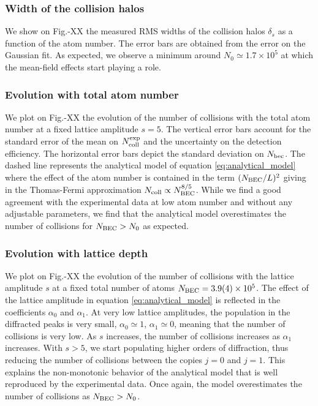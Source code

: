 \subsubsection{Width of the collision halos}

We show on Fig.-XX the measured RMS widths of the collision halos $\delta_s$ as a function of the atom number. The error bars are obtained from the error on the Gaussian fit. As expected, we observe a minimum around $N_0 \simeq 1.7 \times 10^5$ at which the mean-field effects start playing a role. 

\subsubsection{Evolution with total atom number}

We plot on Fig.-XX the evolution of the number of collisions with the total atom number at a fixed lattice amplitude $s=5$. The vertical error bars account for the standard error of the mean on $N_{\rm{coll}}^{\rm{exp}}$ and the uncertainty on the detection  efficiency. The horizontal error  bars depict the standard deviation on $N_{\rm{bec}}$. The dashed line represents the analytical model of equation \ref{eq:analytical_model} where the effect of the atom number is contained in the term $(N_{\rm{BEC}}/L)^2$ giving in the Thomas-Fermi approximation $N_{\rm{coll}} \propto N_{\rm{BEC}}^{8/5}$. While we find a good agreement with the experimental data at low atom number and without any adjustable parameters, we find that the analytical model overestimates the number of collisions for $N_{\rm{BEC}} > N_0$ as expected.

\subsubsection{Evolution with lattice depth}

 We plot on Fig.-XX the evolution of the number of collisions with the lattice amplitude $s$ at a fixed total number of atoms $N_{\rm{BEC}} = 3.9(4) \times 10^5$. The effect of the lattice amplitude in equation \ref{eq:analytical_model} is reflected in the coefficients $\alpha_0$ and $\alpha_1$. At very low lattice amplitudes, the population in the diffracted peaks is very small, $\alpha_0 \simeq 1$, $\alpha_1 \simeq 0$, meaning that the number of collisions is very low. As $s$ increases, the number of collisions increases as $\alpha_1$ increases. With $s > 5$, we start populating higher orders of diffraction, thus reducing the number of collisions between the copies $j=0$ and $j=1$. This explains the non-monotonic behavior of the analytical model that is well reproduced by the experimental data. Once again, the model overestimates the number of collisions as $N_{\rm{BEC}} > N_0$.

